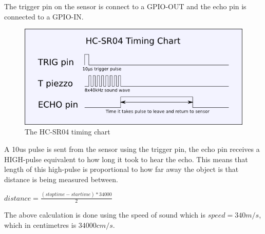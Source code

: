 The trigger pin on the sensor is connect to a GPIO-OUT and the echo pin is connected to a GPIO-IN.

\begin{figure}[H]
	\centering
	\includegraphics[width=.5\linewidth]{images/hcsr04timingchart.png}
	\caption{The HC-SR04 timing chart\cite{hcsr04timingchart}}
\end{figure}

A 10us pulse is sent from the sensor using the trigger pin, the echo pin receives a HIGH-pulse equivalent to how long it took to hear the echo. This means that length of this high-pulse is proportional to how far away the object is that distance is being measured between.\cite{ultrasonichowitworks}

$distance = \frac{(stoptime-startime) * 34000}{2}$

The above calculation is done using the speed of sound which is $speed = 340m/s$, which in centimetres is $34000cm/s$.
